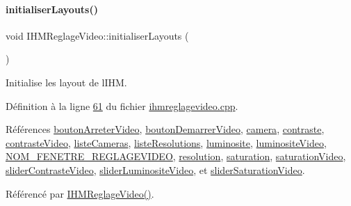 \paragraph{\texorpdfstring{initialiser\+Layouts()}{initialiserLayouts()}}
{\footnotesize\ttfamily void I\+H\+M\+Reglage\+Video\+::initialiser\+Layouts (\begin{DoxyParamCaption}{ }\end{DoxyParamCaption})\hspace{0.3cm}{\ttfamily [private]}}



Initialise les layout de l\textquotesingle{}I\+HM. 



Définition à la ligne \hyperlink{ihmreglagevideo_8cpp_source_l00061}{61} du fichier \hyperlink{ihmreglagevideo_8cpp_source}{ihmreglagevideo.\+cpp}.



Références \hyperlink{ihmreglagevideo_8h_source_l00042}{bouton\+Arreter\+Video}, \hyperlink{ihmreglagevideo_8h_source_l00041}{bouton\+Demarrer\+Video}, \hyperlink{ihmreglagevideo_8h_source_l00037}{camera}, \hyperlink{ihmreglagevideo_8h_source_l00032}{contraste}, \hyperlink{ihmreglagevideo_8h_source_l00035}{contraste\+Video}, \hyperlink{ihmreglagevideo_8h_source_l00038}{liste\+Cameras}, \hyperlink{ihmreglagevideo_8h_source_l00040}{liste\+Resolutions}, \hyperlink{ihmreglagevideo_8h_source_l00031}{luminosite}, \hyperlink{ihmreglagevideo_8h_source_l00034}{luminosite\+Video}, \hyperlink{ihmreglagevideo_8h_source_l00014}{N\+O\+M\+\_\+\+F\+E\+N\+E\+T\+R\+E\+\_\+\+R\+E\+G\+L\+A\+G\+E\+V\+I\+D\+EO}, \hyperlink{ihmreglagevideo_8h_source_l00039}{resolution}, \hyperlink{ihmreglagevideo_8h_source_l00033}{saturation}, \hyperlink{ihmreglagevideo_8h_source_l00036}{saturation\+Video}, \hyperlink{ihmreglagevideo_8h_source_l00029}{slider\+Contraste\+Video}, \hyperlink{ihmreglagevideo_8h_source_l00028}{slider\+Luminosite\+Video}, et \hyperlink{ihmreglagevideo_8h_source_l00030}{slider\+Saturation\+Video}.



Référencé par \hyperlink{ihmreglagevideo_8cpp_source_l00009}{I\+H\+M\+Reglage\+Video()}.


